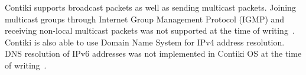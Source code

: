 Contiki supports broadcast packets as well as sending multicast packets.
Joining multicast groups through Internet Group Management Protocol (IGMP)
and receiving non-local multicast packets
was not supported at the time of writing~\cite{contiki-docs}.
Contiki is also able to use Domain Name System for IPv4 address resolution.
DNS resolution of IPv6 addresses was not implemented in Contiki OS
at the time of writing~\cite{contiki-docs}.
